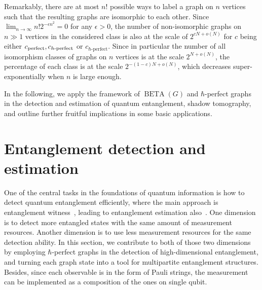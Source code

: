 \documentclass[
12pt,
prx,
aps,
reprint,
a4paper,
longbibliograph,
nofootinbib,
nobibnotes,
superscriptaddress
]{revtex4-2}
\theoremstyle{definition}
\def\be{\operatorname{BETA}}
\begin{document}
Remarkably, there are at most $n!$ possible ways to label a graph on $n$ vertices such that the resulting graphs are isomorphic to each other. Since $\lim_{n\to \infty} n! 2^{-\epsilon n^2} = 0$ for any $\epsilon>0$, the number of non-isomorphic  graphs on $n\gg 1$ vertices in the considered class is also at the scale of $2^{cN+o(N)}$ for $c$ being either $c_{\rm perfect}, c_{h\text{-perfect}}$ or $c_{\hbar\text{-perfect}}$. Since in particular the number of all isomorphism classes of graphs on $n$ vertices is at the scale $2^{N+o(N)}$, the percentage of each class is at the scale $2^{-(1-c)N+o(N)}$, which decreases super-exponentially when $n$ is large enough.

In the following, we apply the framework of $\be(G)$ and $\hbar$-perfect graphs in the detection and estimation of quantum entanglement, shadow tomography, and outline further fruitful implications in some basic applications. 






\section{Entanglement detection and estimation}
\label{sec:entanglement}
One of the central tasks in the foundations of quantum information is how to detect quantum entanglement efficiently, where the main approach is entanglement witness~\cite{horodecki1996necessary,terhal2000bell,huber2013structure}, leading to entanglement estimation also~\cite{brandao2005quantifying,guhne2007estimating,sun2024bounding}.
One dimension is to detect more entangled states with the same amount of measurement resources. Another dimension is to use less measurement resources for the same detection ability.
In this section, we contribute to both of those two dimensions by employing $\hbar$-perfect graphs in the detection of high-dimensional entanglement, and turning each graph state into a tool for multipartite entanglement structures. Besides, since each observable is in the form of Pauli strings, the measurement can be implemented as a composition of the ones on single qubit.
\end{document}
